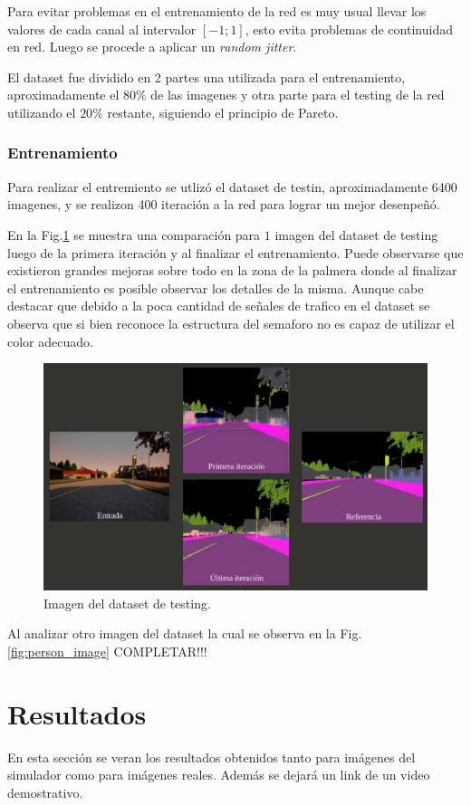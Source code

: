 \documentclass[]{IEEEtran}
\begin{document}
    Para evitar problemas en el entrenamiento de la red es muy usual llevar los valores de cada canal al 
    intervalor $[-1;1]$, esto evita problemas de continuidad en red. Luego 
    se procede a aplicar un \textit{random jitter}.

    El dataset fue dividido en 2 partes una utilizada para el entrenamiento, aproximadamente el $80 \% $ de las imagenes y 
    otra parte para el testing de la red utilizando el $20 \%$ restante, siguiendo el principio de Pareto.

    \subsubsection{Entrenamiento}

    Para realizar el entremiento se utlizó el dataset de testin, aproximadamente 6400 imagenes, 
    y se realizon 400 iteración a la red para lograr un mejor desenpeñó. 
    
    En la Fig.\ref{fig:resultados}
    se muestra una comparación para $1$ imagen del dataset de testing luego de la primera iteración 
    y al finalizar el entrenamiento.
    Puede observarse que existieron grandes mejoras sobre todo en la zona de la palmera
    donde al finalizar el entrenamiento es posible observar los detalles de la misma.
    Aunque cabe destacar que debido a la poca cantidad de señales de trafico en el dataset
    se observa que si bien reconoce la estructura del semaforo no es capaz de utilizar el color 
    adecuado.

    \begin{figure}[htb]
        \centering
        \includegraphics[width=.4\textwidth]{Imgs/grapics_results.jpg}    
        \caption{Imagen del dataset de testing.}
        \label{fig:resultados}
    \end{figure}

    Al analizar otro imagen del dataset la cual se observa en la Fig.\ref{fig:person_image}
    {COMPLETAR!!!}



    \section{Resultados}
    En esta sección se veran los resultados obtenidos tanto para imágenes del simulador como para imágenes reales. Además se dejará un 
    link de un video demostrativo.
\end{document}
